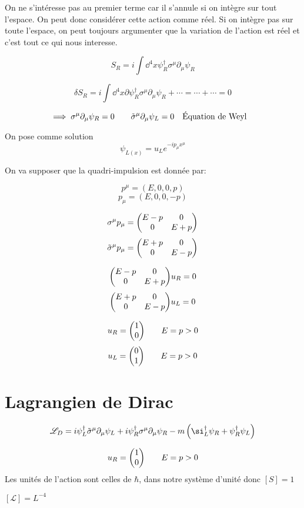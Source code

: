 On ne s'intéresse pas au premier terme car il s'annule si on intègre sur tout l'espace. On peut donc considérer cette action comme réel. Si on intègre pas sur toute l'espace, on peut toujours argumenter que la variation de l'action est réel et c'est tout ce qui nous interesse. 


$$S_R =  i \int \dd ^4 x \psi_R^{\dagger}\sigma^{\mu}\partial_{\mu} \psi_R $$ 

$$\delta S_R  = i \int \dd^{4}x \partial \psi_R ^{\dagger}	\sigma^{\mu}\partial_{\mu} \psi_R + \dotsb = \dotsb + \dotsb =0$$ 

$$\implies \sigma^{\mu}\partial_{\mu} \psi_R = 0 \qquad \tilde \sigma^{\mu}\partial_{\mu} \psi_L = 0 \qq{Équation de Weyl}$$ 
 
On pose comme solution $$\psi_{L(x)} = u_L e^{-i p_{\mu} x^{\mu}}$$ 

On va supposer que la quadri-impulsion est donnée par:

$$p^{\mu}= (E, 0,0,p)$$ 
$$p_{\mu}= (E, 0,0,-p)$$ 

$$\sigma^{\mu}p_{\mu} = \mqty(E-p & 0 \\ 0 & E+p)$$ 
$$\tilde \sigma^{\mu}p_{\mu} = \mqty(E+p&0\\0 & E-p)$$ 


$$\mqty(E-p&0\\0 & E+p)u_R = 0$$ 
$$\mqty(E+p&0\\0 & E-p)u_L = 0$$ 

$$u_R = \mqty(1 \\0) \qquad E= p > 0$$ 
$$u_L = \mqty(0 \\1) \qquad E= p > 0$$ 


\section*{Lagrangien de Dirac}

$$\mathscr{L}_D  = i\psi_L^{\dagger}\tilde \sigma^{\mu}\partial_{\mu} \psi_L + i\psi_R^{\dagger}\sigma^{\mu}\partial_{\mu} \psi_R - m \left( \si_L ^{\dagger}\psi_R + \psi_R^{\dagger} \psi_L \right) $$ 

$$u_R = \mqty(1 \\0) \qquad E= p > 0$$ 
Les unités de l'action sont celles de $\hbar$, dans notre système d'unité donc $[S]=1$   

$[\mathscr{L} ] =  L^{-4}$ 

